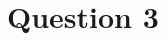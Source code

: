 \documentclass[12pt]{article}
\begin{document}











\section*{Question 3}

\bigskip
\end{document}
